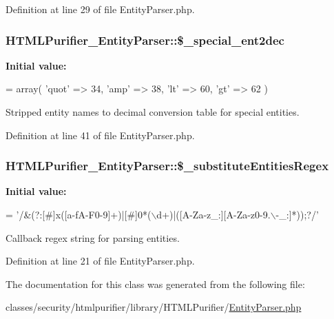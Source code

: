 Definition at line 29 of file Entity\+Parser.\+php.

\hypertarget{classHTMLPurifier__EntityParser_a1233260b0aaf087445e962aca4d12689}{
\subsubsection[{\$\+\_\+special\+\_\+ent2dec}]{\setlength{\rightskip}{0pt plus 5cm}H\+T\+M\+L\+Purifier\+\_\+\+Entity\+Parser\+::\$\+\_\+special\+\_\+ent2dec\hspace{0.3cm}{\ttfamily [protected]}}}\label{classHTMLPurifier__EntityParser_a1233260b0aaf087445e962aca4d12689}
{\bfseries Initial value\+:}
\begin{DoxyCode}
=
            array(
                    \textcolor{stringliteral}{'quot'} => 34,
                    \textcolor{stringliteral}{'amp'}  => 38,
                    \textcolor{stringliteral}{'lt'}   => 60,
                    \textcolor{stringliteral}{'gt'}   => 62
            )
\end{DoxyCode}
Stripped entity names to decimal conversion table for special entities. 

Definition at line 41 of file Entity\+Parser.\+php.

\hypertarget{classHTMLPurifier__EntityParser_a0d3d84748792da4caba3150a0a9daaf9}{
\subsubsection[{\$\+\_\+substitute\+Entities\+Regex}]{\setlength{\rightskip}{0pt plus 5cm}H\+T\+M\+L\+Purifier\+\_\+\+Entity\+Parser\+::\$\+\_\+substitute\+Entities\+Regex\hspace{0.3cm}{\ttfamily [protected]}}}\label{classHTMLPurifier__EntityParser_a0d3d84748792da4caba3150a0a9daaf9}
{\bfseries Initial value\+:}
\begin{DoxyCode}
=
\textcolor{stringliteral}{'/&(?:[#]x([a-fA-F0-9]+)|[#]0*(\(\backslash\)d+)|([A-Za-z\_:][A-Za-z0-9.\(\backslash\)-\_:]*));?/'}
\end{DoxyCode}
Callback regex string for parsing entities. 

Definition at line 21 of file Entity\+Parser.\+php.



The documentation for this class was generated from the following file\+:\begin{DoxyCompactItemize}
\item 
classes/security/htmlpurifier/library/\+H\+T\+M\+L\+Purifier/\hyperlink{EntityParser_8php}{Entity\+Parser.\+php}\end{DoxyCompactItemize}
